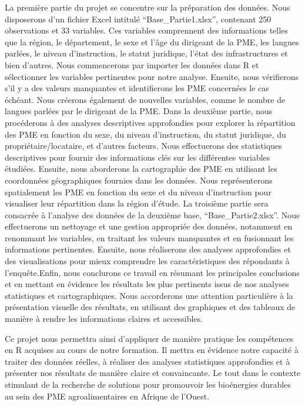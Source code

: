 \documentclass[
]{article}
\begin{document}
La première partie du projet se concentre sur la préparation des
données. Nous disposerons d'un fichier Excel intitulé
``Base\_Partie1.xlsx'', contenant 250 observations et 33 variables. Ces
variables comprennent des informations telles que la région, le
département, le sexe et l'âge du dirigeant de la PME, les langues
parlées, le niveau d'instruction, le statut juridique, l'état des
infrastructures et bien d'autres. Nous commencerons par importer les
données dans R et sélectionner les variables pertinentes pour notre
analyse. Ensuite, nous vérifierons s'il y a des valeurs manquantes et
identifierons les PME concernées le cas échéant. Nous créerons également
de nouvelles variables, comme le nombre de langues parlées par le
dirigeant de la PME. Dans la deuxième partie, nous procéderons à des
analyses descriptives approfondies pour explorer la répartition des PME
en fonction du sexe, du niveau d'instruction, du statut juridique, du
propriétaire/locataire, et d'autres facteurs. Nous effectuerons des
statistiques descriptives pour fournir des informations clés sur les
différentes variables étudiées. Ensuite, nous aborderons la cartographie
des PME en utilisant les coordonnées géographiques fournies dans les
données. Nous représenterons spatialement les PME en fonction du sexe et
du niveau d'instruction pour visualiser leur répartition dans la région
d'étude. La troisième partie sera consacrée à l'analyse des données de
la deuxième base, ``Base\_Partie2.xlsx''. Nous effectuerons un nettoyage
et une gestion appropriée des données, notamment en renommant les
variables, en traitant les valeurs manquantes et en fusionnant les
informations pertinentes. Ensuite, nous réaliserons des analyses
approfondies et des visualisations pour mieux comprendre les
caractéristiques des répondants à l'enquête.Enfin, nous conclurons ce
travail en résumant les principales conclusions et en mettant en
évidence les résultats les plus pertinents issus de nos analyses
statistiques et cartographiques. Nous accorderons une attention
particulière à la présentation visuelle des résultats, en utilisant des
graphiques et des tableaux de manière à rendre les informations claires
et accessibles.

Ce projet nous permettra ainsi d'appliquer de manière pratique les
compétences en R acquises au cours de notre formation. Il mettra en
évidence notre capacité à traiter des données réelles, à réaliser des
analyses statistiques approfondies et à présenter nos résultats de
manière claire et convaincante. Le tout dans le contexte stimulant de la
recherche de solutions pour promouvoir les bioénergies durables au sein
des PME agroalimentaires en Afrique de l'Ouest.
\end{document}
